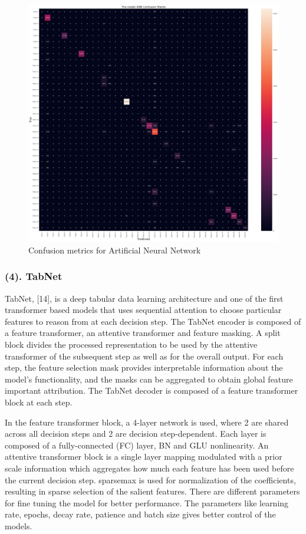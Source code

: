 \documentclass[conference,final, 10pt]{IEEEtran}
\begin{document}
\begin{figure}

{\centering \includegraphics[width=0.9\linewidth]{img/ANN} 

}

\caption{Confusion metrics for Artificial Neural Network}\label{fig:unnamed-chunk-14}
\end{figure}

\subsubsection{(4). TabNet}\label{tabnet}

TabNet, {[}14{]}, is a deep tabular data learning architecture and one
of the first transformer based models that uses sequential attention to
choose particular features to reason from at each decision step. The
TabNet encoder is composed of a feature transformer, an attentive
transformer and feature masking. A split block divides the processed
representation to be used by the attentive transformer of the subsequent
step as well as for the overall output. For each step, the feature
selection mask provides interpretable information about the model's
functionality, and the masks can be aggregated to obtain global feature
important attribution. The TabNet decoder is composed of a feature
transformer block at each step.

In the feature transformer block, a 4-layer network is used, where 2 are
shared across all decision steps and 2 are decision step-dependent. Each
layer is composed of a fully-connected (FC) layer, BN and GLU
nonlinearity. An attentive transformer block is a single layer mapping
modulated with a prior scale information which aggregates how much each
feature has been used before the current decision step. sparsemax is
used for normalization of the coefficients, resulting in sparse
selection of the salient features. There are different parameters for
fine tuning the model for better performance. The parameters like
learning rate, epochs, decay rate, patience and batch size gives better
control of the models.
\end{document}
